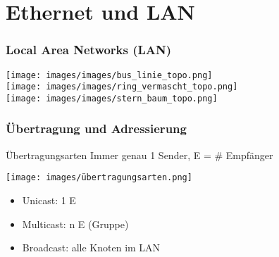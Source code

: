 \section{Ethernet und LAN}
\subsubsection{Local Area Networks (LAN)}

    \centering
    \texttt{[image: images/images/bus\_linie\_topo.png]}\\
    \texttt{[image: images/images/ring\_vermascht\_topo.png]}\\
    \texttt{[image: images/images/stern\_baum\_topo.png]}

\subsubsection{Übertragung und Adressierung}

\begin{definition}{Übertragungsarten}
    Immer genau 1 Sender, E = \# Empfänger
    
    \begin{minipage}{0.35\linewidth}
        \texttt{[image: images/übertragungsarten.png]}
    \end{minipage}
    \begin{minipage}{0.6\linewidth}
        \begin{itemize}
            \item Unicast: 1 E 
            \item Multicast: n E (Gruppe)
            \item Broadcast: alle Knoten im LAN
        \end{itemize}
    \end{minipage}
\end{definition}


